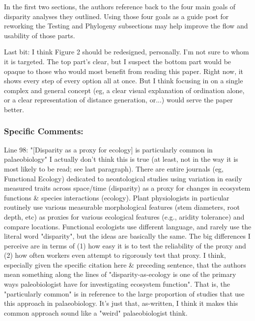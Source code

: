 \documentclass[12pt,letterpaper]{article}
\begin{document}

In the first two sections, the authors reference back to the four main goals of disparity analyses they outlined. Using those four goals as a guide post for reworking the Testing and Phylogeny subsections may help improve the flow and usability of those parts.


Last bit: I think Figure 2 should be redesigned, personally. I'm not sure to whom it is targeted. The top part's clear, but I suspect the bottom part would be opaque to those who would most benefit from reading this paper. Right now, it shows every step of every option all at once. But I think focusing in on a single complex and general concept (eg, a clear visual explanation of ordination alone, or a clear representation of distance generation, or...) would serve the paper better. 


\subsubsection{Specific Comments:}

Line 98: "[Disparity as a proxy for ecology] is particularly common in palaeobiology" I actually don't think this is true (at least, not in the way it is most likely to be read; see last paragraph). There are entire journals (eg, Functional Ecology) dedicated to neontological studies using variation in easily measured traits across space/time (disparity) as a proxy for changes in ecosystem functions \& species interactions (ecology). Plant physiologists in particular routinely use various measurable morphological features (stem diameters, root depth, etc) as proxies for various ecological features (e.g., aridity tolerance) and compare locations. 
Functional ecologists use different language, and rarely use the literal word "disparity", but the ideas are basically the same. The big differences I perceive are in terms of (1) how easy it is to test the reliability of the proxy and (2) how often workers even attempt to rigorously test that proxy. 
I think, especially given the specific citation here \& preceding sentence, that the authors mean something along the lines of "disparity-as-ecology is one of the primary ways paleobiologist have for investigating ecosystem function". That is, the "particularly common" is in reference to the large proportion of studies that use this approach in palaeobiology. It's just that, as-written, I think it makes this common approach sound like a "weird" palaeobiologist think.
\end{document}
